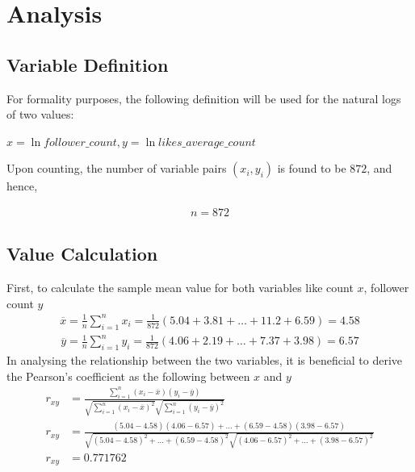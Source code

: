 \documentclass[11pt]{article}
\begin{document}
\section{Analysis}\label{section-analysis}

\subsection{Variable Definition}
For formality purposes, the following definition will be used for the natural logs of two values:

$x=\ln{\mathit{follower\_count}}, y=\ln{\mathit{likes\_average\_count}}$

Upon counting, the number of variable pairs $ \left( x _ { i }, y _ { i } \right)$ is found to be $872$, and hence, 

\begin{align}
{n = 872}
\end{align}

\subsection{Value Calculation}
First, to calculate the sample mean value for both variables like count $x$, follower count $y$
\begin{align}
\overline { x } = \frac { 1 } { n } \sum _ { i = 1 } ^ { n } x _ { i } = \frac { 1 } { 872 } (5.04 + 3.81 + \ldots + 11.2 + 6.59)  { = 4.58}
\end{align}
\begin{align}
\overline { y } = \frac { 1 } { n } \sum _ { i = 1 } ^ { n } y _ { i }  = \frac { 1 } { 872 } (4.06 + 2.19 + \ldots + 7.37 + 3.98)  {= 6.57}
\end{align}
In analysing the relationship between the two variables, it is beneficial to derive the Pearson's coefficient as the following between $x$ and $y$
\begin{align}
r _ { x y } &= \frac { \sum _ { i = 1 } ^ { n } \left( x _ { i } - \overline { x } \right) \left( y _ { i } - \overline { y } \right) } { \sqrt { \sum _ { i = 1 } ^ { n } \left( x _ { i } - \overline { x } \right) ^ { 2 } } \sqrt { \sum _ { i = 1 } ^ { n } \left( y _ { i } - \overline { y } \right) ^ { 2 } } } \\ 
r _ { x y } &= \frac {\left( 5.04 - 4.58 \right) \left( 4.06 - 6.57\right)  + \ldots + {\left( 6.59 - 4.58 \right) \left( 3.98 - 6.57\right) }}  { \sqrt { \left( 5.04 - 4.58\right) ^ { 2 }  + \ldots +  \left( 6.59 - 4.58\right)^{2}} \sqrt { \left( 4.06 - 6.57\right) ^ { 2 }  + \ldots +  \left( 3.98 - 6.57\right)^{2}} } \\
r _ { x y } &= {0.771762}
\end{align}
\end{document}

